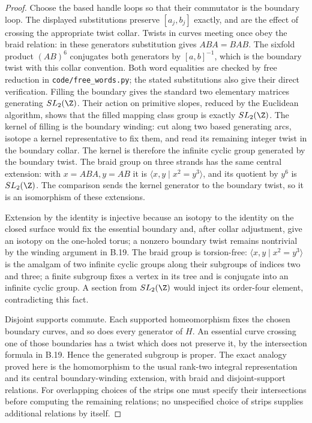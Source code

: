 \begin{proof}
Choose the based handle loops so that their commutator is the boundary loop.
The displayed substitutions preserve $[a_j,b_j]$ exactly, and are the effect
of crossing the appropriate twist collar. Twists in curves meeting once obey
the braid relation: in these generators substitution gives $ABA=BAB$.
The sixfold product $(AB)^6$ conjugates both generators by
$[a,b]^{-1}$, which is the boundary twist with this collar convention.
Both word equalities are checked by free reduction in
\texttt{code/free\_words.py}; the stated substitutions also give their direct
verification. Filling the boundary gives the standard two elementary matrices
generating $SL_2(\Z)$. Their action on primitive slopes, reduced by the Euclidean
algorithm, shows that the filled mapping class group is exactly $SL_2(\Z)$.
The kernel of filling is the boundary winding: cut along two based generating
arcs, isotope a kernel representative to fix them, and read its remaining
integer twist in the boundary collar. The kernel is therefore the infinite
cyclic group generated by the boundary twist. The braid group on three strands
has the same central extension: with $x=ABA,y=AB$ it is
$\langle x,y\mid x^2=y^3\rangle$, and its quotient by $y^6$ is $SL_2(\Z)$.
The comparison sends the kernel generator to the boundary twist, so it is an
isomorphism of these extensions.

Extension by the identity is injective because an isotopy to the identity on
the closed surface would fix the essential boundary and, after collar adjustment,
give an isotopy on the one-holed torus; a nonzero boundary twist remains
nontrivial by the winding argument in B.19. The braid group is torsion-free:
$\langle x,y\mid x^2=y^3\rangle$ is the amalgam of two infinite cyclic groups
along their subgroups of indices two and three; a finite subgroup fixes a vertex
in its tree and is conjugate into an infinite cyclic group. A section from
$SL_2(\Z)$ would inject its order-four element, contradicting this fact.

Disjoint supports commute. Each supported homeomorphism fixes the chosen
boundary curves, and so does every generator of $H$. An essential curve crossing
one of those boundaries has a twist which does not preserve it, by the
intersection formula in B.19. Hence the generated subgroup is proper.
The exact analogy proved here is the homomorphism to the usual rank-two
integral representation and its central boundary-winding extension, with braid
and disjoint-support relations. For overlapping choices of the strips one
must specify their intersections before computing the remaining relations;
no unspecified choice of strips supplies additional relations by itself.
\end{proof}

